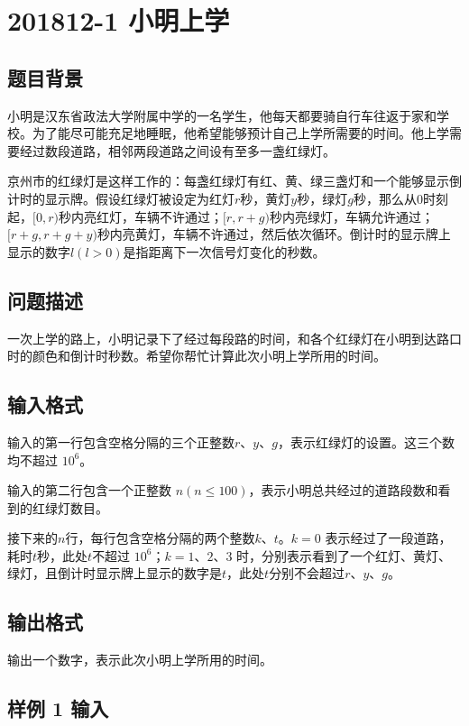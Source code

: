 \section{201812-1 小明上学}

\subsection{题目背景}

小明是汉东省政法大学附属中学的一名学生，他每天都要骑自行车往返于家和学校。为了能尽可能充足地睡眠，他希望能够预计自己上学所需要的时间。他上学需要经过数段道路，相邻两段道路之间设有至多一盏红绿灯。

京州市的红绿灯是这样工作的：每盏红绿灯有红、黄、绿三盏灯和一个能够显示倒计时的显示牌。假设红绿灯被设定为红灯$r$秒，黄灯$y$秒，绿灯$g$秒，那么从$0$时刻起，$[0,r)$秒内亮红灯，车辆不许通过；$[r, r+g)$秒内亮绿灯，车辆允许通过；$[r+g, r+g+y)$秒内亮黄灯，车辆不许通过，然后依次循环。倒计时的显示牌上显示的数字$l(l > 0)$是指距离下一次信号灯变化的秒数。

\subsection{问题描述}

一次上学的路上，小明记录下了经过每段路的时间，和各个红绿灯在小明到达路口时的颜色和倒计时秒数。希望你帮忙计算此次小明上学所用的时间。

\subsection{输入格式}

输入的第一行包含空格分隔的三个正整数$r$、$y$、$g$，表示红绿灯的设置。这三个数均不超过 $10^6$。

输入的第二行包含一个正整数 $n(n\leq 100)$，表示小明总共经过的道路段数和看到的红绿灯数目。

接下来的$n$行，每行包含空格分隔的两个整数$k$、$t$。$k=0$ 表示经过了一段道路，耗时$t$秒，此处$t$不超过 $10^6$；$k=1$、$2$、$3$ 时，分别表示看到了一个红灯、黄灯、绿灯，且倒计时显示牌上显示的数字是$t$，此处$t$分别不会超过$r$、$y$、$g$。
 
\subsection{输出格式}

输出一个数字，表示此次小明上学所用的时间。

\subsection{样例 1 输入}


